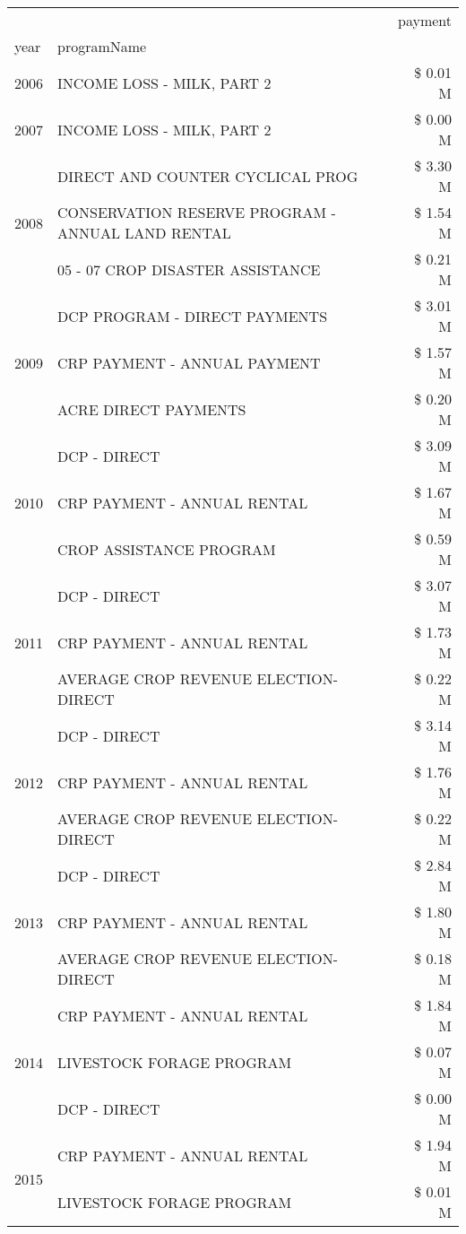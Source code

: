 \begin{tabular}{llr}
\toprule
 &  & payment \\
year & programName &  \\
\midrule
2006 & INCOME LOSS - MILK, PART 2 & \$ 0.01 M \\
\cline{1-3}
2007 & INCOME LOSS - MILK, PART 2 & \$ 0.00 M \\
\cline{1-3}
\multirow[t]{3}{*}{2008} & DIRECT AND COUNTER CYCLICAL PROG & \$ 3.30 M \\
 & CONSERVATION RESERVE PROGRAM - ANNUAL LAND RENTAL & \$ 1.54 M \\
 & 05 - 07 CROP DISASTER ASSISTANCE & \$ 0.21 M \\
\cline{1-3}
\multirow[t]{3}{*}{2009} & DCP PROGRAM - DIRECT PAYMENTS & \$ 3.01 M \\
 & CRP PAYMENT - ANNUAL PAYMENT & \$ 1.57 M \\
 & ACRE DIRECT PAYMENTS & \$ 0.20 M \\
\cline{1-3}
\multirow[t]{3}{*}{2010} & DCP - DIRECT & \$ 3.09 M \\
 & CRP PAYMENT - ANNUAL RENTAL & \$ 1.67 M \\
 & CROP ASSISTANCE PROGRAM & \$ 0.59 M \\
\cline{1-3}
\multirow[t]{3}{*}{2011} & DCP - DIRECT & \$ 3.07 M \\
 & CRP PAYMENT - ANNUAL RENTAL & \$ 1.73 M \\
 & AVERAGE CROP REVENUE ELECTION-DIRECT & \$ 0.22 M \\
\cline{1-3}
\multirow[t]{3}{*}{2012} & DCP - DIRECT & \$ 3.14 M \\
 & CRP PAYMENT - ANNUAL RENTAL & \$ 1.76 M \\
 & AVERAGE CROP REVENUE ELECTION-DIRECT & \$ 0.22 M \\
\cline{1-3}
\multirow[t]{3}{*}{2013} & DCP - DIRECT & \$ 2.84 M \\
 & CRP PAYMENT - ANNUAL RENTAL & \$ 1.80 M \\
 & AVERAGE CROP REVENUE ELECTION-DIRECT & \$ 0.18 M \\
\cline{1-3}
\multirow[t]{3}{*}{2014} & CRP PAYMENT - ANNUAL RENTAL & \$ 1.84 M \\
 & LIVESTOCK FORAGE PROGRAM & \$ 0.07 M \\
 & DCP - DIRECT & \$ 0.00 M \\
\cline{1-3}
\multirow[t]{3}{*}{2015} & CRP PAYMENT - ANNUAL RENTAL & \$ 1.94 M \\
 & LIVESTOCK FORAGE PROGRAM & \$ 0.01 M \\

\end{tabular}
